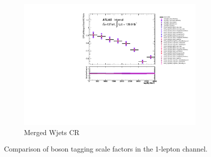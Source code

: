\begin{figure}[ht]
\begin{subfigure}[b]{0.32\textwidth}
        \includegraphics[width=\textwidth]{figures/1lep/VTaggerUnc/VTagCRVjetMergedtagMjj_SystBreakDown.pdf}
        \caption{Merged Wjets CR}
        \label{fig:MergedWjetsCR}
    \end{subfigure}
    \caption{Comparison of boson tagging scale factors in the 1-lepton channel.}
    \label{fig:1LepVTaggerUnc}
\end{figure}


